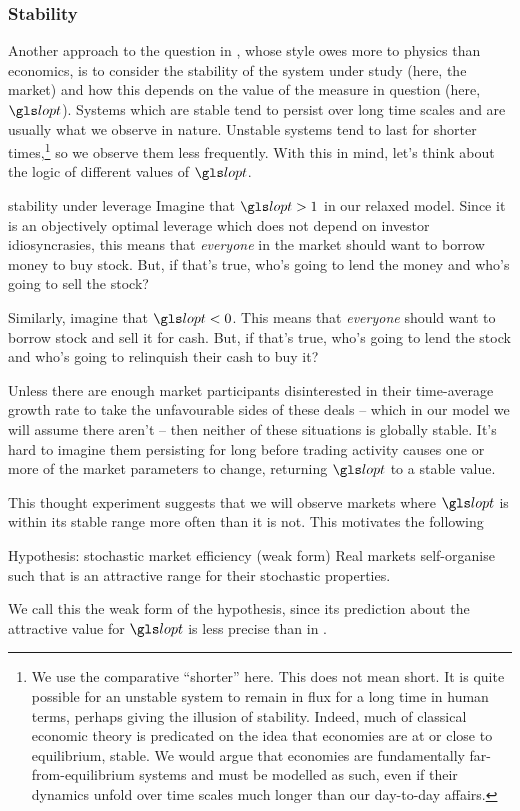 \subsubsection{Stability}
Another approach to the question in , whose style owes more to physics than economics, is to consider the stability of the system under study (here, the market) and how this depends on the value of the measure in question (here, $\lopt$). Systems which are stable tend to persist over long time scales and are usually what we observe in nature. Unstable systems tend to last for shorter times,\footnote{We use the comparative ``shorter'' here. This does not mean short. It is quite possible for an unstable system to remain in flux for a long time in human terms, perhaps giving the illusion of stability. Indeed, much of classical economic theory is predicated on the idea that economies are at or close to equilibrium, \ie stable. We would argue that economies are fundamentally far-from-equilibrium systems and must be modelled as such, even if their dynamics unfold over time scales much longer than our day-to-day affairs.} so we observe them less frequently. With this in mind, let's think about the logic of different values of $\lopt$.

\begin{thoughtex}{stability under leverage}
Imagine that $\lopt>1$ in our relaxed model. Since it is an objectively optimal leverage which does not depend on investor idiosyncrasies, this means that \textit{everyone} in the market should want to borrow money to buy stock. But, if that's true, who's going to lend the money and who's going to sell the stock?

Similarly, imagine that $\lopt<0$. This means that \textit{everyone} should want to borrow stock and sell it for cash. But, if that's true, who's going to lend the stock and who's going to relinquish their cash to buy it?

Unless there are enough market participants disinterested in their time-average growth rate to take the unfavourable sides of these deals -- which in our model we will assume there aren't -- then neither of these situations is globally stable. It's hard to imagine them persisting for long before trading activity causes one or more of the market parameters to change, returning $\lopt$ to a stable value.
\end{thoughtex}

This thought experiment suggests that we will observe markets where $\lopt$ is within its stable range more often than it is not. This motivates the following
\begin{keypts}{Hypothesis: stochastic market efficiency (weak form)}
Real markets self-organise such that
\be
{}
\ee
is an attractive range for their stochastic properties.
\end{keypts}
We call this the weak form of the hypothesis, since its prediction about the attractive value for $\lopt$ is less precise than in .

